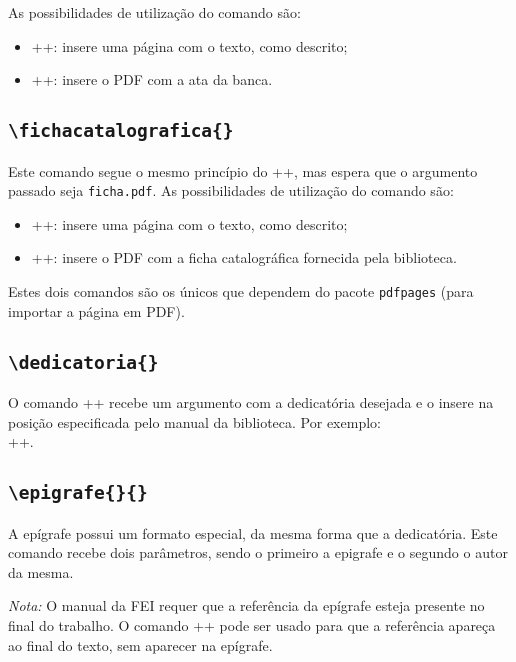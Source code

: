 \documentclass{fei}
\begin{document}
    As possibilidades de utilização do comando são:
    \begin{itemize}
        \item \latexinline+\folhadeaprovacao{}+: insere uma página com o texto, como descrito;
        \item \latexinline++: insere o PDF com a ata da banca.
    \end{itemize}
    
    
    \subsection{\texttt{\textbackslash fichacatalografica\{\}}}
    Este comando segue o mesmo princípio do \latexinline+\folhadeaprovacao{}+, mas espera que o argumento passado seja \texttt{ficha.pdf}. As possibilidades de utilização do comando são:
    \begin{itemize}
        \item \latexinline+\fichacatalografica{}+: insere uma página com o texto, como descrito;
        \item \latexinline++: insere o PDF com a ficha catalográfica fornecida pela biblioteca.
    \end{itemize}
 
 Estes dois comandos são os únicos que dependem do pacote \texttt{pdfpages} (para importar a página em PDF).

    \subsection{\texttt{\textbackslash dedicatoria\{\}}}
    O comando \latexinline+\dedicatoria{}+ recebe um argumento com a dedicatória desejada e o insere na posição especificada pelo manual da biblioteca. Por exemplo: \\ \latexinline++.
    
    \subsection{\texttt{\textbackslash epigrafe\{\}\{\}}}
    A epígrafe possui um formato especial, da mesma forma que a dedicatória. Este comando recebe dois parâmetros, sendo o primeiro a epigrafe e o segundo o autor da mesma.
    
    \emph{Nota:} O manual da FEI requer que a referência da epígrafe esteja presente no final do trabalho. O comando \latexinline+\nocite{obra}+ pode ser usado para que a referência apareça ao final do texto, sem aparecer na epígrafe.
    
\end{document}
